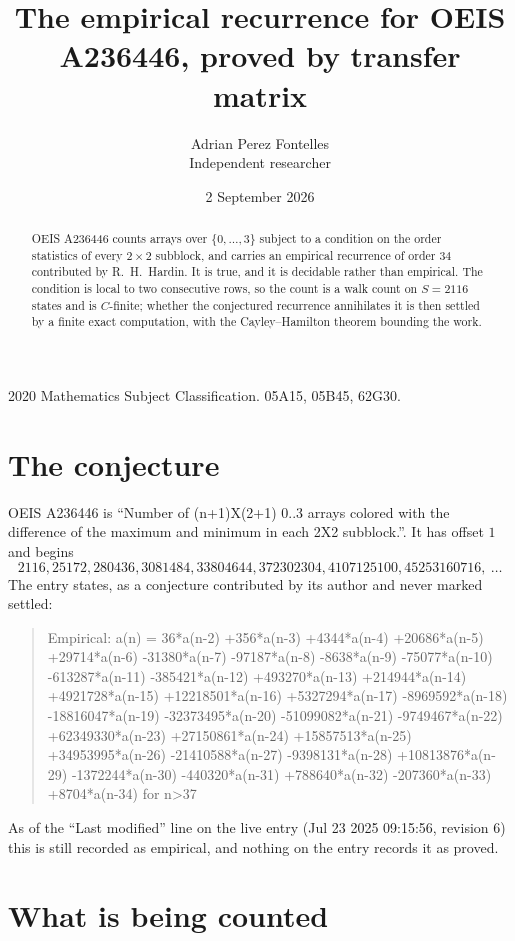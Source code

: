\documentclass[11pt,a4paper]{article}
\title{The empirical recurrence for OEIS A236446, proved by transfer matrix}
\author{Adrian Perez Fontelles\\ \small Independent researcher}
\date{2 September 2026}
\theoremstyle{plain}
\theoremstyle{definition}
\begin{document}
\maketitle

\begin{abstract}
OEIS A236446 counts arrays over $\{0,\dots,3\}$ subject to a condition on the order
statistics of every $2\times2$ subblock, and carries an empirical recurrence of order
$34$ contributed by R.~H.~Hardin. It is true, and it is decidable rather than empirical.
The condition is local to two consecutive rows, so the count is a walk count on $S=2116$
states and is $C$-finite; whether the conjectured recurrence annihilates it is then settled by
a finite exact computation, with the Cayley--Hamilton theorem bounding the work.
\end{abstract}

\noindent\small 2020 Mathematics Subject Classification. 05A15, 05B45, 62G30.\normalsize

\section{The conjecture}

OEIS A236446 is ``Number of (n+1)X(2+1) 0..3 arrays colored with the difference of the maximum and minimum in each 2X2 subblock.''. It has offset $1$ and begins
\[
2116, 25172, 280436, 3081484, 33804644, 372302304, 4107125100, 45253160716,\ \dots
\]
The entry states, as a conjecture contributed by its author and never marked settled:
\begin{quote}
Empirical: a(n) = 36*a(n-2) +356*a(n-3) +4344*a(n-4) +20686*a(n-5) +29714*a(n-6) -31380*a(n-7) -97187*a(n-8) -8638*a(n-9) -75077*a(n-10) -613287*a(n-11) -385421*a(n-12) +493270*a(n-13) +214944*a(n-14) +4921728*a(n-15) +12218501*a(n-16) +5327294*a(n-17) -8969592*a(n-18) -18816047*a(n-19) -32373495*a(n-20) -51099082*a(n-21) -9749467*a(n-22) +62349330*a(n-23) +27150861*a(n-24) +15857513*a(n-25) +34953995*a(n-26) -21410588*a(n-27) -9398131*a(n-28) +10813876*a(n-29) -1372244*a(n-30) -440320*a(n-31) +788640*a(n-32) -207360*a(n-33) +8704*a(n-34) for n>37
\end{quote}
As of the ``Last modified'' line on the live entry (Jul 23 2025 09:15:56, revision 6) this is still
recorded as empirical, and nothing on the entry records it as proved.

\section{What is being counted}
\end{document}
